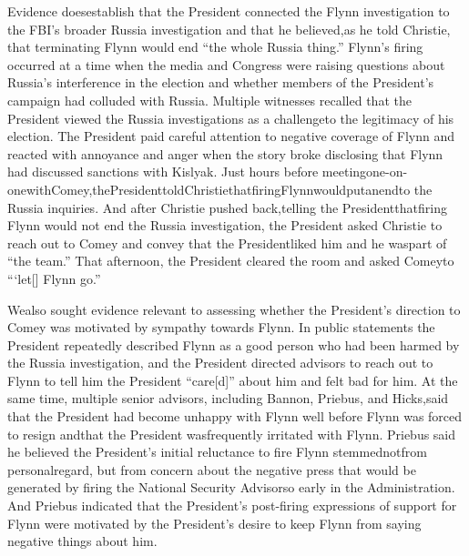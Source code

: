 Evidence doesestablish that the President connected the Flynn investigation to the FBI’s broader Russia investigation and that he believed,as he told Christie, that terminating Flynn would end “the whole Russia thing.” Flynn’s firing occurred at a time when the media and Congress were raising questions about Russia’s interference in the election and whether members of the President’s campaign had colluded with Russia. Multiple witnesses recalled that the President viewed the Russia investigations as a challengeto the legitimacy of his election. The President paid careful attention to negative coverage of Flynn and reacted with annoyance and anger when the story broke disclosing that Flynn had discussed sanctions with Kislyak. Just hours before meetingone-on-onewithComey,thePresidenttoldChristiethatfiringFlynnwouldputanendto the Russia inquiries. And after Christie pushed back,telling the Presidentthatfiring Flynn would not end the Russia investigation, the President asked Christie to reach out to Comey and convey that the Presidentliked him and he waspart of “the team.” That afternoon, the President cleared the room and asked Comeyto “‘let[] Flynn go.”

Wealso sought evidence relevant to assessing whether the President’s direction to Comey was motivated by sympathy towards Flynn. In public statements the President repeatedly described Flynn as a good person who had been harmed by the Russia investigation, and the President directed advisors to reach out to Flynn to tell him the President “care[d]” about him and felt bad for him. At the same time, multiple senior advisors, including Bannon, Priebus, and Hicks,said that the President had become unhappy with Flynn well before Flynn was forced to resign andthat the President wasfrequently irritated with Flynn. Priebus said he believed the President’s initial reluctance to fire Flynn stemmednotfrom personalregard, but from concern about the negative press that would be generated by firing the National Security Advisorso early in the Administration. And Priebus indicated that the President’s post-firing expressions of support for Flynn were motivated by the President’s desire to keep Flynn from saying negative things about him.

